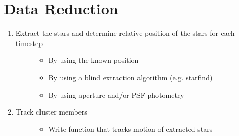 \documentclass[letterpaper,10pt,english]{sphinxmanual}
\begin{document}
\section{Data Reduction}
\label{\detokenize{Project_Overview/Tasks:data-reduction}}\begin{enumerate}
%
\item {} \begin{description}
\item[{Extract the stars and determine relative position of the stars for each timestep}] \leavevmode\begin{itemize}
\item {} 
\sphinxAtStartPar
By using the known position

\item {} 
\sphinxAtStartPar
By using a blind extraction algorithm (e.g. starfind)

\item {} 
\sphinxAtStartPar
By using aperture and/or PSF photometry

\end{itemize}

\end{description}

\item {} \begin{description}
\item[{Track cluster members}] \leavevmode\begin{itemize}
\item {} 
\sphinxAtStartPar
Write function that tracks motion of extracted stars

\end{itemize}

\end{description}

\end{enumerate}
\end{document}
